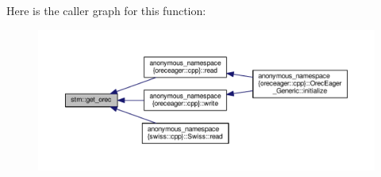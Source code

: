 Here is the caller graph for this function\-:
\nopagebreak
\begin{figure}[H]
\begin{center}
\leavevmode
\includegraphics[width=350pt]{namespacestm_a059f2742566005f0d199d47a4f3131d2_icgraph}
\end{center}
\end{figure}


